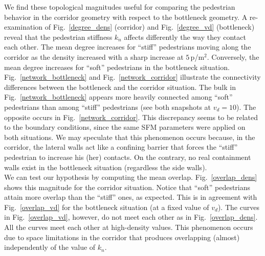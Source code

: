 \documentclass[preprint,12pt]{elsarticle}
\begin{document}
We find these topological magnitudes useful for comparing the  pedestrian
behavior in the  corridor geometry with respect to the bottleneck geometry. A
re-examination of  Fig.~\ref{degree_dens} (corridor) and Fig.~\ref{degree_vd}
(bottleneck) reveal  that the pedestrian stiffness $k_n$ affects differently the
way they contact  each other. The mean degree increases for ``stiff''
pedestrians moving along  the corridor as the density increased with a sharp
increase at  $5\,$p/m$^2$. Conversely, the mean degree  increases for ``soft''
pedestrians in the bottleneck situation.\\

Fig.~\ref{network_bottleneck} and  Fig.~\ref{network_corridor} illustrate the
connectivity differences between  the bottleneck and the corridor situation. The
bulk in  Fig.~\ref{network_bottleneck} appears more heavily connected among
``soft''  pedestrians than among ``stiff'' pedestrians (see both snapshots at
$v_d=10$).  The opposite occurs in Fig.~\ref{network_corridor}. This discrepancy
seems to  be related to the boundary conditions, since the same SFM parameters
were  applied on both situations. We may speculate that this phenomenon occurs
because, in the corridor, the lateral walls act like a  confining barrier that
forces the ``stiff'' pedestrian to increase his (her) contacts. On the contrary,
no real containment walls exist in the bottleneck situation (regardless the side
walls). \\

We can test our hypothesis by computing the mean overlap. 
Fig.~\ref{overlap_dens} shows this magnitude for the corridor situation. Notice 
that ``soft'' pedestrians attain more overlap than the ``stiff'' 
ones, as expected. This is in agreement with Fig.~\ref{overlap_vd} for the 
bottleneck situation (at a fixed value of $v_d$). The curves in 
Fig.~\ref{overlap_vd}, however, do not meet each other as in  
Fig.~\ref{overlap_dens}. All the curves meet each other at
high-density values. This phenomenon occurs due to space limitations
in the corridor that produces overlapping (almost) independently of 
the value of $k_n$. \\
\end{document}
